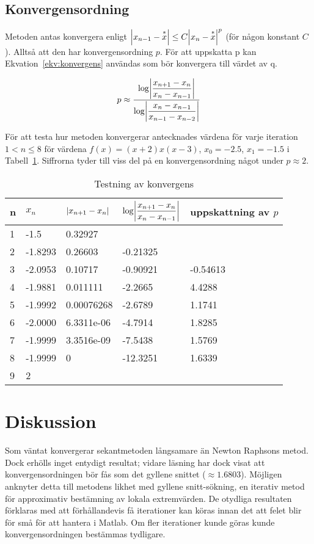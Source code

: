 \documentclass{article}
\DeclarePairedDelimiter\abs{\lvert}{\rvert}
\begin{document}
\subsection{Konvergensordning}
Metoden antas konvergera enligt $\abs*{x_{n-1}-\overset{*}{x}}\leq C\abs*{x_n-\overset{*}{x}}^p$ (för någon konstant $C$). Alltså att den har konvergensordning $p$. För att uppskatta p kan Ekvation~\ref{ekv:konvergens} användas som bör konvergera till värdet av q.

\begin{equation}
  p\approx\dfrac{\log\abs*{\dfrac{x_{n+1}-x_n}{x_n-x_{n-1}}}}{\log\abs*{\dfrac{x_n-x_{n-1}}{x_{n-1}-x_{n-2}}}}
\label{ekv:konvergens}
\end{equation}

För att testa hur metoden konvergerar antecknades värdena för varje iteration $1 < n \leq 8$ för värdena $f(x)=(x+2) x (x-3)$, $x_0=-2.5$, $x_1=-1.5$ i Tabell~\ref{konvergens}. Siffrorna tyder till viss del på en konvergensordning något under $p\approx 2$.

\begin{table}[H]
  \begin{tabu}{l l l l l}
    n & $x_n$ & $\abs{x_{n+1}-x_n}$ & $\log\abs*{\dfrac{x_{n+1}-x_n}{x_n-x_{n-1}}}$ & uppskattning av $p$\\
     & -1.5    & 0.32927 \\
    2 & -1.8293 & 0.26603     & -0.21325 & \\
    3 & -2.0953 & 0.10717     & -0.90921 & -0.54613 \\
    4 & -1.9881 & 0.011111    & -2.2665  & 4.4288 \\
    5 & -1.9992 & 0.00076268  & -2.6789  & 1.1741 \\
    6 & -2.0000 & 6.3311e-06  & -4.7914  & 1.8285 \\
    7 & -1.9999 & 3.3516e-09  & -7.5438  & 1.5769 \\
    8 & -1.9999 & 0           & -12.3251 & 1.6339 \\
    9 & 2
  \end{tabu}
  \caption{Testning av konvergens}\label{konvergens}
\end{table}

\section{Diskussion}
Som väntat konvergerar sekantmetoden långsamare än Newton Raphsons metod. Dock erhölls inget entydigt resultat; vidare läsning har dock visat att konvergensordningen bör fås som det gyllene snittet ($\approx 1.6803$). Möjligen anknyter detta till metodens likhet med gyllene snitt-sökning, en iterativ metod för approximativ bestämning av lokala extremvärden. De otydliga resultaten förklaras med att förhållandevis få iterationer kan köras innan det att felet blir för små för att hantera i Matlab. Om fler iterationer kunde göras kunde konvergensordningen bestämmas tydligare.
\end{document}
